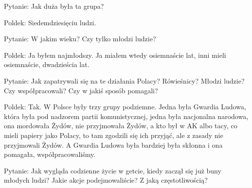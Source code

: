 Pytanie: Jak duża była ta grupa? 

Poldek: Siedemdziesięciu ludzi.  

Pytanie: W jakim wieku? Czy tylko młodzi ludzie?  

Poldek: Ja byłem najmłodszy. Ja miałem wtedy osiemnaście lat, inni mieli osiemnaście, dwadzieścia lat. 

Pytanie: Jak zapatrywali się na te działania Polacy? Rówieśnicy? Młodzi ludzie? Czy współpracowali? Czy w jakiś sposób pomagali? 

Poldek: Tak. W Polsce były trzy grupy podziemne. Jedna była Gwardia Ludowa, która była pod nadzorem partii komunistycznej, jedna była nacjonalna narodowa, ona mordowała Żydów, nie przyjmowała Żydów, a kto był w AK albo tacy, co mieli papiery jako Polacy, to tam zgodzili się ich przyjąć, ale z zasady nie przyjmowali Żydów. A Gwardia Ludowa była bardziej była skłonna i ona pomagała, współpracowaliśmy. 

Pytanie: Jak wygląda codzienne życie w getcie, kiedy zaczął się już buny młodych ludzi? Jakie akcje podejmowaliście? Z jaką częstotliwością?   

